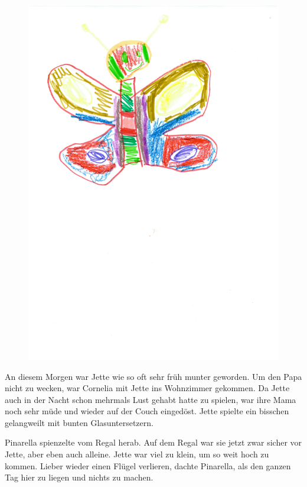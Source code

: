 \begin{figure}[ht]
\centering
\includegraphics[width=\textwidth]{bilder/pinarella.pdf}
\end{figure}

An diesem Morgen war Jette wie so oft sehr früh munter geworden. Um den Papa nicht zu wecken, war Cornelia mit Jette ins Wohnzimmer gekommen. Da Jette auch in der Nacht schon mehrmals Lust gehabt hatte zu spielen, war ihre Mama noch sehr müde und wieder auf der Couch eingedöst. Jette spielte ein bisschen gelangweilt mit bunten Glasuntersetzern. 

Pinarella spienzelte vom Regal herab.  Auf dem Regal war sie jetzt zwar sicher vor Jette, aber eben auch alleine. Jette war viel zu klein, um so weit hoch zu kommen. Lieber wieder einen Flügel verlieren, dachte Pinarella, als den ganzen Tag hier zu liegen und nichts zu machen.

